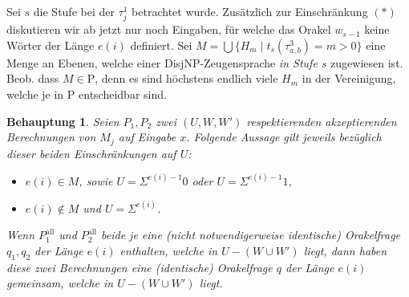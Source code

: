 \documentclass[nofonts]{uebung}
\newtheorem{claim}[theorem]{Behauptung}
\theoremstyle{definition}
\def\P{\ensuremath{\mathrm{P}}}
\begin{document}
Sei $s$ die Stufe bei der $\tau^1_j$ betrachtet wurde.
Zusätzlich zur Einschränkung $(\ast)$ diskutieren wir ab jetzt nur noch Eingaben, für welche das Orakel $w_{s-1}$ keine Wörter der Länge $e(i)$ definiert.
Sei $M=\bigcup \{ H_m \mid t_s(\tau^3_{a,b})=m>0 \}$ eine Menge an Ebenen, welche einer DisjNP-Zeugensprache \emph{in Stufe $s$} zugewiesen ist.
Beob. dass $M\in \P$, denn es sind höchstens endlich viele $H_m$ in der Vereinigung, welche je in $\P$ entscheidbar sind.


\begin{claim}
    Seien $P_1, P_2$ zwei $(U, W, W')$ respektierenden akzeptierenden Berechnungen von $M_j$ auf Eingabe $x$.
    Folgende Aussage gilt jeweils bezüglich dieser beiden Einschränkungen auf $U$:
    \begin{itemize}[nosep]
        \item $e(i)\in M$, sowie $U=\Sigma^{e(i)-1}0$ oder $U=\Sigma^{e(i)-1}1$,
        \item $e(i)\not\in M$ und $U=\Sigma^{e(i)}$.
    \end{itemize}

    Wenn $P^\mathrm{all}_1$ und $P^\mathrm{all}_2$ beide je eine (nicht notwendigerweise identische) Orakelfrage $q_1, q_2$ der Länge $e(i)$ enthalten, welche in $U-(W\cup W')$ liegt, dann haben diese zwei Berechnungen eine (identische) Orakelfrage $q$ der Länge $e(i)$ gemeinsam, welche in $U-(W\cup W')$ liegt.
\end{claim}
\end{document}
